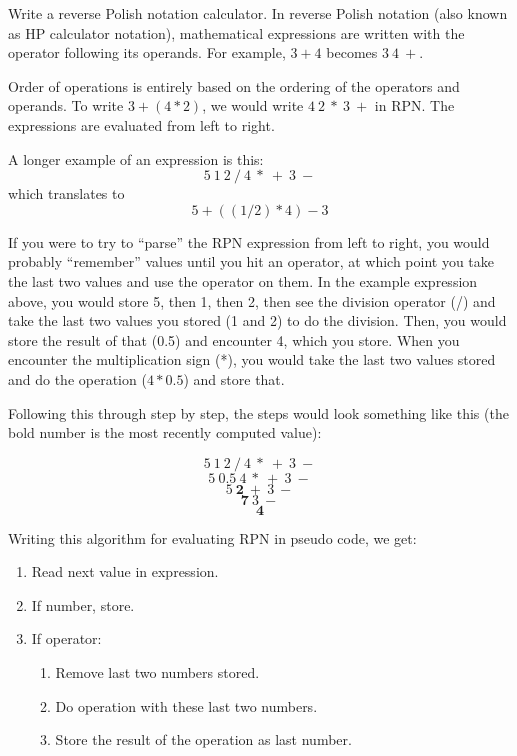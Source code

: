 \documentclass[11pt]{cselabheader}
\begin{document}
\begin{ex} Write a reverse Polish notation
    calculator. In reverse Polish notation (also known as HP
    calculator notation), mathematical expressions are written with the operator
    following its operands. For example, $3 + 4$ becomes $3~4~+$.

    Order of operations is entirely based on the ordering of the operators
    and operands. To write $3 + (4 * 2)$, we would write $4~2~*~3~+$ in RPN.
    The expressions are evaluated from left to right.

    A longer example of an expression is this: 
    \[ 5~1~2~/~4~*~+~3~- \]
    which translates to
    \[ 5 + ( (1 / 2) * 4 ) - 3 \]

    If you were to try to ``parse'' the RPN expression from left to right, you
    would probably ``remember'' values until you hit an operator, at which point
    you take the last two values and use the operator on them. In the example
    expression above, you would store 5, then 1, then 2, then see the division
    operator (/) and take the last two values you stored (1 and 2) to do the
    division. Then, you would store the result of that (0.5) and encounter
    4, which you store. When you encounter the multiplication sign (*), you
    would take the last two values stored and do the operation ($4 * 0.5$)
    and store that.

    Following this through step by step, the steps would look something like
    this (the bold number is the most recently computed value):

    \[5~1~2~/~4~*~+~3~-\]
    \[5~\bm{0.5}~4~*~+~3~-\]
    \[5~\bm{2}~+~3~-\]
    \[\bm{7}~3~-\]
    \[\bm{4}\]

    Writing this algorithm for evaluating RPN in pseudo code, we get:

\begin{enumerate}
  \item Read next value in expression.
  \item If number, store.
  \item If operator:
    \begin{enumerate}
      \item Remove last two numbers stored.
      \item Do operation with these last two numbers.
      \item Store the result of the operation as last number.
    \end{enumerate}
\end{enumerate}


\end{ex}
\end{document}

